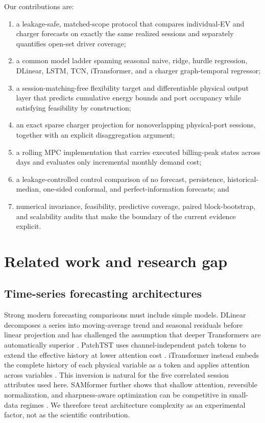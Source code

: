 \documentclass[11pt]{article}
\begin{document}
Our contributions are:
\begin{enumerate}
  \item a leakage-safe, matched-scope protocol that compares individual-EV and
  charger forecasts on exactly the same realized sessions and separately
  quantifies open-set driver coverage;
  \item a common model ladder spanning seasonal naive, ridge, hurdle
  regression, DLinear, LSTM, TCN, iTransformer, and a charger graph-temporal
  regressor;
  \item a session-matching-free flexibility target and differentiable physical
  output layer that predicts cumulative energy bounds and port occupancy while
  satisfying feasibility by construction;
  \item an exact sparse charger projection for nonoverlapping physical-port
  sessions, together with an explicit disaggregation argument;
  \item a rolling MPC implementation that carries executed billing-peak states
  across days and evaluates only incremental monthly demand cost;
  \item a leakage-controlled control comparison of no forecast, persistence,
  historical-median, one-sided conformal, and perfect-information forecasts;
  and
  \item numerical invariance, feasibility, predictive coverage, paired
  block-bootstrap, and scalability audits
  that make the boundary of the current evidence explicit.
\end{enumerate}

\section{Related work and research gap}

\subsection{Time-series forecasting architectures}

Strong modern forecasting comparisons must include simple models.
DLinear decomposes a series into moving-average trend and seasonal residuals
before linear projection and has challenged the assumption that deeper
Transformers are automatically superior \citep{zeng2023dlinear}.  PatchTST
uses channel-independent patch tokens to extend the effective history at lower
attention cost \citep{nie2023patchtst}.  iTransformer instead embeds the
complete history of each physical variable as a token and applies attention
across variables \citep{liu2024itransformer}.  This inversion is natural for
the five correlated session attributes used here.  SAMformer further shows
that shallow attention, reversible normalization, and sharpness-aware
optimization can be competitive in small-data regimes
\citep{ilbert2024samformer}.  We therefore treat architecture complexity as an
experimental factor, not as the scientific contribution.
\end{document}
